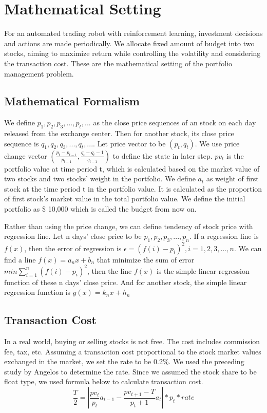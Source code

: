 \chapter{Mathematical Setting}
\label{Ch:mathematical description}
For an automated trading robot with reinforcement learning, investment decisions and actions are made periodically. We allocate fixed amount of budget into two stocks, aiming to maximize return while controlling the volatility and considering the transaction cost. These are the mathematical setting of the portfolio management problem.

\section{Mathematical Formalism}
We define $p_1,p_2,p_3,...,p_t,...$ as the close price sequences of an stock on each day released from the exchange center. Then for another stock, its close price sequence is $q_1,q_2,q_3,...,q_t,...$. Let price vector to be $(p_t, q_t)$. We use price change vector $(\frac{p_t-p_{t-1}}{p_{t-1}},\frac{q_t-q_t-1}{q_{t-1}})$ to define the state in later step.
$pv_t$ is the portfolio value at time period t, which is calculated based on the market value of two stocks and two stocks' weight in the portfolio. We define $a_t$ as weight of first stock at the time period t in the portfolio value. It is calculated as the proportion of first stock's market value in the total portfolio value. We define the initial portfolio as \$ 10,000 which is called the budget from now on.

Rather than using the price change, we can define tendency of stock price with regression line. Let n days’ close price to be $p_1,p_2,p_3,...,p_n$. If a regression line is $f(x)$, then the error of regression is $\epsilon=(f(i)-p_i)^2, i=1,2,3,...,n$. We can find a line $f(x)=a_nx+b_n$ that minimize the sum of error $min\sum_{i=1}^{n}(f(i)-p_i)^2$, then the line $f(x)$ is the simple linear regression function of these n days’ close price. And for another stock, the simple linear regression function is $g(x)=k_nx+h_n$


\section{Transaction Cost}
In a real world, buying or selling stocks is not free. The cost includes commission fee, tax, etc. Assuming a transaction cost proportional to the stock market values exchanged in the market, we set the rate to be 0.2\%. We used the preceding study by Angelos to determine the rate. Since we assumed the stock share to be float type, we used formula below to calculate transaction cost. 
$$\frac{T}{2} = |\frac{pv_t}{p_t}a_{t-1} - \frac{pv_{t+1}-T}{p_t+1}a_t|*p_t*rate$$


